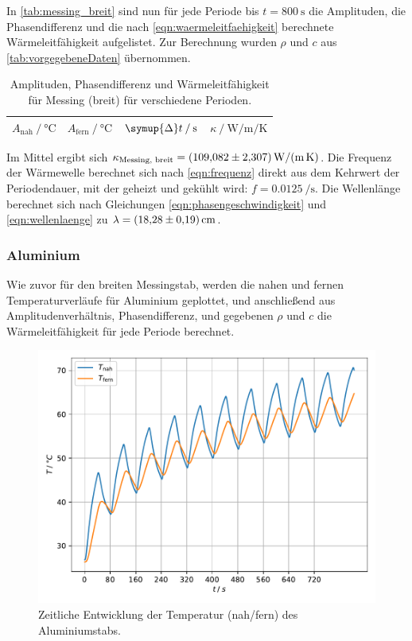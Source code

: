 In \autoref{tab:messing_breit} sind nun für jede Periode bis $t = \SI{800}{\second}$ die Amplituden, die Phasendifferenz und die nach \autoref{eqn:waermeleitfaehigkeit} berechnete Wärmeleitfähigkeit aufgelistet.
Zur Berechnung wurden $\rho$ und $c$ aus \autoref{tab:vorgegebeneDaten} übernommen.

\begin{table}[H]
     \centering
     \caption{Amplituden, Phasendifferenz und Wärmeleitfähigkeit für Messing (breit) für verschiedene Perioden.}
     \label{tab:messing_breit}
     \begin{tabular}{c c c c}
      \toprule
      $A_\text{nah} \mathbin{/} \si{\celsius}$ &
      $A_\text{fern} \mathbin{/} \si{\celsius}$ &
      $\symup{\Delta}t \mathbin{/} \si{\second}$ &
      $\kappa \mathbin{/} \si{\watt\per\meter\per\kelvin}$ \\
      \midrule
      
      \bottomrule
     \end{tabular}
\end{table}

Im Mittel ergibt sich $\kappa_\text{Messing, breit} = \SI{109.082 \pm 2.307}{\watt\per\meter\per\kelvin}$.
Die Frequenz der Wärmewelle berechnet sich nach \autoref{eqn:frequenz} direkt aus dem Kehrwert der Periodendauer,
mit der geheizt und gekühlt wird: $f = \SI{0.0125}{\per\second}$.
Die Wellenlänge berechnet sich nach Gleichungen \eqref{eqn:phasengeschwindigkeit} und \eqref{eqn:wellenlaenge} zu $\lambda = \SI{18.28 \pm 0.19}{\centi\meter}$.


\subsubsection{Aluminium}

Wie zuvor für den breiten Messingstab,
werden die nahen und fernen Temperaturverläufe für Aluminium geplottet,
und anschließend aus Amplitudenverhältnis, Phasendifferenz, und gegebenen $\rho$ und $c$
die Wärmeleitfähigkeit für jede Periode berechnet.

\begin{figure}[H]
  \centering
  \includegraphics{build/plot_dynamisch_aluminium.pdf}
  \caption{Zeitliche Entwicklung der Temperatur (nah/fern) des Aluminiumstabs.}
  \label{fig:dynamisch_aluminium}
\end{figure}

